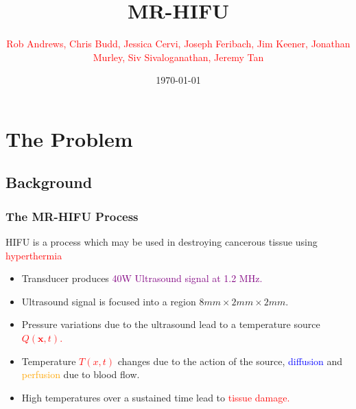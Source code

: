 \documentclass{beamer}
\title{MR-HIFU}
\author{ \textcolor{red}{Rob Andrews, Chris Budd, Jessica Cervi, Joseph Feribach, Jim Keener, Jonathan Murley, Siv Sivaloganathan, Jeremy Tan}}
\date{\today}
\begin{document}
\begin{frame}
\maketitle
\end{frame}
\begin{frame}
 \tableofcontents
\end{frame}

\section{The Problem}
\subsection{Background}
\begin{frame}
\frametitle{The MR-HIFU Process}

HIFU is a process which may be used in destroying cancerous tissue using \textcolor{red}{hyperthermia}

\vspace{0.25in}

\begin{itemize}
\item Transducer produces \textcolor{purple}{40W Ultrasound signal at 1.2 MHz.}
\item Ultrasound signal is focused into a region $8mm \times 2mm \times 2mm$.
\item Pressure variations due to the ultrasound lead to a temperature source \textcolor{red}{$Q({\mathbf x},t)$.}
\item Temperature \textcolor{red}{$T(x,t)$} changes due to the action of the source, \textcolor{blue}{diffusion} and \textcolor{orange}{perfusion} due to blood flow.
\item High temperatures over a sustained time lead to \textcolor{red}{tissue damage.}
\end{itemize}



\end{frame}
\end{document}
